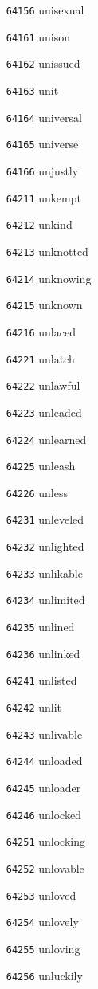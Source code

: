\documentclass[twoside,11pt]{article}
\begin{document}
\begin{multicols}{5}
\begin{enumerate}
\item[\texttt{64156}] unisexual
\item[\texttt{64161}] unison
\item[\texttt{64162}] unissued
\item[\texttt{64163}] unit
\item[\texttt{64164}] universal
\item[\texttt{64165}] universe
\item[\texttt{64166}] unjustly
\item[\texttt{64211}] unkempt
\item[\texttt{64212}] unkind
\item[\texttt{64213}] unknotted
\item[\texttt{64214}] unknowing
\item[\texttt{64215}] unknown
\item[\texttt{64216}] unlaced
\item[\texttt{64221}] unlatch
\item[\texttt{64222}] unlawful
\item[\texttt{64223}] unleaded
\item[\texttt{64224}] unlearned
\item[\texttt{64225}] unleash
\item[\texttt{64226}] unless
\item[\texttt{64231}] unleveled
\item[\texttt{64232}] unlighted
\item[\texttt{64233}] unlikable
\item[\texttt{64234}] unlimited
\item[\texttt{64235}] unlined
\item[\texttt{64236}] unlinked
\item[\texttt{64241}] unlisted
\item[\texttt{64242}] unlit
\item[\texttt{64243}] unlivable
\item[\texttt{64244}] unloaded
\item[\texttt{64245}] unloader
\item[\texttt{64246}] unlocked
\item[\texttt{64251}] unlocking
\item[\texttt{64252}] unlovable
\item[\texttt{64253}] unloved
\item[\texttt{64254}] unlovely
\item[\texttt{64255}] unloving
\item[\texttt{64256}] unluckily

\end{enumerate}
\end{multicols}
\end{document}
